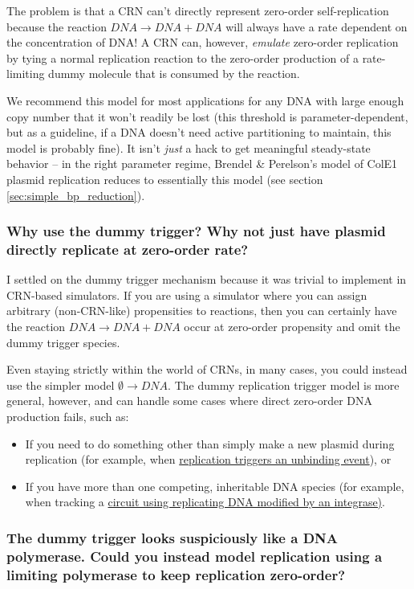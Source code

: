 \documentclass[preprint,12pt]{oldplainarticle}
\begin{document}
The problem is that a CRN can't directly represent zero-order self-replication because the reaction $DNA \to DNA + DNA$ will always have a rate dependent on the concentration of DNA! A CRN can, however, \emph{emulate} zero-order replication by tying a normal replication reaction to the zero-order production of a rate-limiting dummy molecule that is consumed by the reaction.

We recommend this model for most applications for any DNA with large enough copy number that it won't readily be lost (this threshold is parameter-dependent, but as a guideline, if a DNA doesn't need active partitioning to maintain, this model is probably fine). It isn't \emph{just} a hack to get meaningful steady-state behavior -- in the right parameter regime, Brendel \& Perelson's model of ColE1 plasmid replication reduces to essentially this model (see section \ref{sec:simple_bp_reduction}).

\subsubsection{Why use the dummy trigger? Why not just have plasmid directly replicate at zero-order rate?}

I settled on the dummy trigger mechanism because it was trivial to implement in CRN-based simulators. If you are using a simulator where you can assign arbitrary (non-CRN-like) propensities to reactions, then you can certainly have the reaction $DNA \to DNA + DNA$ occur at zero-order propensity and omit the dummy trigger species. 

Even staying strictly within the world of CRNs, in many cases, you could instead use the simpler model $\emptyset \to DNA$. The dummy replication trigger model is more general, however, and can handle some cases where direct zero-order DNA production fails, such as:

\begin{itemize}
	\item If you need to do something other than simply make a new plasmid during replication (for example, when \hyperref[ss:CRISPRi]{replication triggers an unbinding event}), or 
	\item If you have more than one competing, inheritable DNA species (for example, when tracking a \hyperref[ss:temporal_gate]{circuit using replicating DNA modified by an integrase)}.
\end{itemize}

\subsubsection{The dummy trigger looks suspiciously like a DNA polymerase. Could you instead model replication using a limiting polymerase to keep replication zero-order?}
\end{document}
